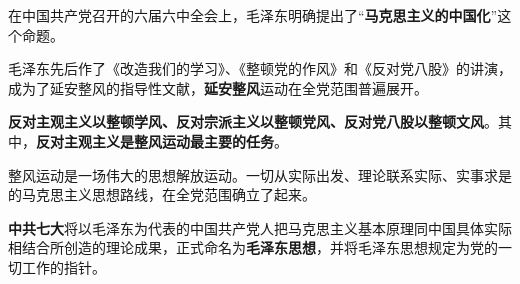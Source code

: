 在中国共产党召开的六届六中全会上，毛泽东明确提出了``\textbf{马克思主义的中国化}''这个命题。{}

毛泽东先后作了《改造我们的学习》、《整顿党的作风》和《反对党八股》的讲演，成为了延安整风的指导性文献，\textbf{延安整风}运动在全党范围普遍展开。

\textbf{反对主观主义以整顿学风、反对宗派主义以整顿党风、反对党八股以整顿文风}{。其中，}\textbf{反对主观主义是整风运动最主要的任务}{。}

整风运动是一场伟大的思想解放运动。一切从实际出发、理论联系实际、实事求是的马克思主义思想路线，在全党范围确立了起来{。}

\textbf{中共七大}{将以毛泽东为代表的中国共产党人把马克思主义基本原理同中国具体实际相结合所创造的理论成果，正式命名为}\textbf{毛泽东思想}{，并将毛泽东思想规定为党的一切工作的指针。}
